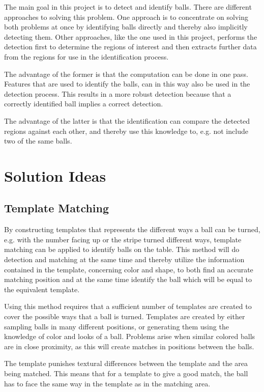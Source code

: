 The main goal in this project is to detect and identify balls. There are different approaches to solving this problem. One approach is to concentrate on solving both problems at once by identifying balls directly and thereby also implicitly detecting them. Other approaches, like the one used in this project, performs the detection first to determine the regions of interest and then extracts further data from the regions for use in the identification process.

The advantage of the former is that the computation can be done in one pass. Features that are used to identify the balls, can in this way also be used in the detection process. This results in a more robust detection because that a correctly identified ball implies a correct detection.

The advantage of the latter is that the identification can compare the detected regions against each other, and thereby use this knowledge to, e.g. not include two of the same balls.

\section{Solution Ideas}

\subsection{Template Matching}
By constructing templates that represents the different ways a ball can be turned, e.g. with the number facing up or the stripe turned different ways, template matching can be applied to identify balls on the table. This method will do detection and matching at the same time and thereby utilize the information contained in the template, concerning color and shape, to both find an accurate matching position and at the same time identify the ball which will be equal to the equivalent template.

Using this method requires that a sufficient number of templates are created to cover the possible ways that a ball is turned. Templates are created by either sampling balls in many different positions, or generating them using the knowledge of color and looks of a ball. Problems arise when similar colored balls are in close proximity, as this will create matches in positions between the balls.

The template punishes textural differences between the template and the area being matched. This means that for a template to give a good match, the ball has to face the same way in the template as in the matching area.

